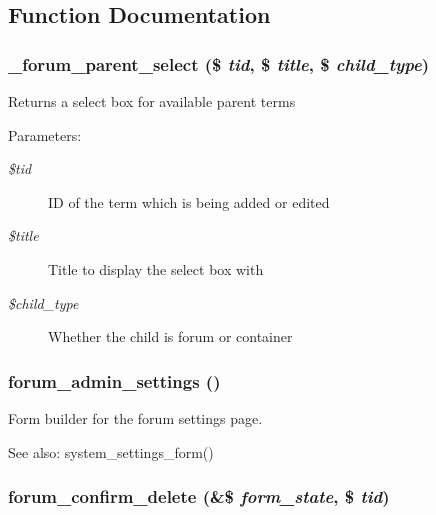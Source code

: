 \subsection{Function Documentation}
\hypertarget{forum_8admin_8inc_b33107c6a704c306d24ed1ea5dd8dc35}{
\subsubsection[{\_\-forum\_\-parent\_\-select}]{\setlength{\rightskip}{0pt plus 5cm}\_\-forum\_\-parent\_\-select (\$ {\em tid}, \/  \$ {\em title}, \/  \$ {\em child\_\-type})}}
\label{forum_8admin_8inc_b33107c6a704c306d24ed1ea5dd8dc35}


Returns a select box for available parent terms

\begin{Desc}
\item[Parameters:]
\begin{description}
\item[{\em \$tid}]ID of the term which is being added or edited \item[{\em \$title}]Title to display the select box with \item[{\em \$child\_\-type}]Whether the child is forum or container \end{description}
\end{Desc}
\hypertarget{forum_8admin_8inc_cd8c00cc4e3eafecdfc06b733e3c19da}{
\subsubsection[{forum\_\-admin\_\-settings}]{\setlength{\rightskip}{0pt plus 5cm}forum\_\-admin\_\-settings ()}}
\label{forum_8admin_8inc_cd8c00cc4e3eafecdfc06b733e3c19da}


Form builder for the forum settings page.

\begin{Desc}
\item[See also:]system\_\-settings\_\-form() \end{Desc}
\hypertarget{forum_8admin_8inc_ade50fde9ac2dcd0b03902770597fde2}{
\subsubsection[{forum\_\-confirm\_\-delete}]{\setlength{\rightskip}{0pt plus 5cm}forum\_\-confirm\_\-delete (\&\$ {\em form\_\-state}, \/  \$ {\em tid})}}
\label{forum_8admin_8inc_ade50fde9ac2dcd0b03902770597fde2}


